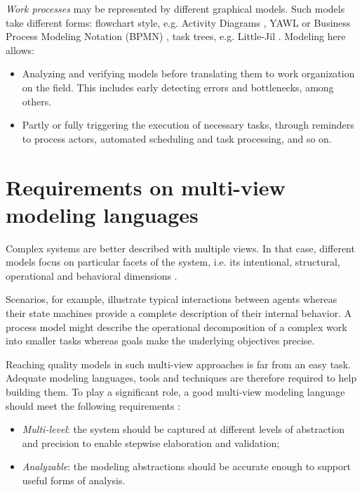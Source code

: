 
\emph{Work processes} may be represented by different graphical models. Such models take different forms: flowchart style, e.g. Activity Diagrams \cite{OMG:2004}, YAWL \cite{Vanderaalst:2005} or Business Process Modeling Notation (BPMN) \cite{OMG:2008}, task trees, e.g. Little-Jil \cite{Clarke:2008}. Modeling here allows:
\begin{itemize}
\item Analyzing and verifying models before translating them to work organization on the field. This includes early detecting errors and bottlenecks, among others.
\item Partly or fully triggering the execution of necessary tasks, through reminders to process actors, automated scheduling and task processing, and so on.
\end{itemize}

\section{Requirements on multi-view modeling languages}

Complex systems are better described with multiple views. In that case, different models focus on particular facets of the system, i.e. its intentional, structural, operational and behavioral dimensions \cite{VanLamsweerde:2009}. 

Scenarios, for example, illustrate typical interactions between agents whereas their state machines provide a complete description of their internal behavior. A process model might describe the operational decomposition of a complex work into smaller tasks whereas goals make the underlying objectives precise.

Reaching quality models in such multi-view approaches is far from an easy task. Adequate modeling languages, tools and techniques are therefore required to help building them. To play a significant role, a good multi-view modeling language should meet the following requirements \cite{VanLamsweerde:2009}:

\begin{itemize}
\item \emph{Multi-level}: the system should be captured at different levels of abstraction and precision to enable stepwise elaboration and validation;
\item \emph{Analyzable}: the modeling abstractions should be accurate enough to support useful forms of analysis.
\end{itemize}

